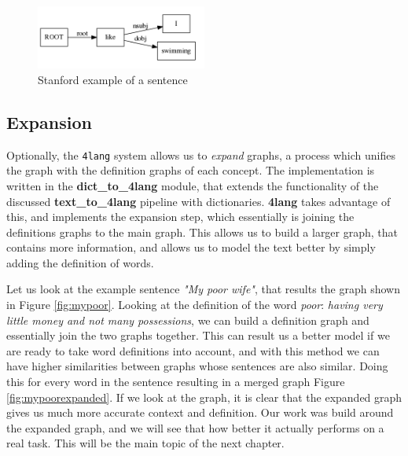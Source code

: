 \begin{figure}[h]
	\centering
	\includegraphics[width=0.5\textwidth]{figures/swimmingdep}
	\caption{Stanford example of a sentence}
	\label{fig:swimmingdep}
\end{figure}


\subsection{Expansion}
Optionally, the \texttt{4lang} system allows us to \textit{expand}
graphs, a process which unifies the graph with the definition graphs of
each concept. The implementation is written in the \textbf{dict\_to\_4lang} module, that extends the functionality of the discussed \textbf{text\_to\_4lang} pipeline with dictionaries. \textbf{4lang} takes advantage of this, and implements the expansion step, which essentially is joining the definitions graphs to the main graph. This allows us to build a larger graph, that contains more information, and allows us to model the text better by simply adding the definition of words.

Let us look at the example sentence \textit{"My poor wife"}, that results the graph shown in Figure \ref{fig:mypoor}. Looking at the definition of the word \textit{poor}: \textit{having very little money and not many possessions}, we can build a definition graph and essentially join the two graphs together. This can result us a better model if we are ready to take word definitions into account, and with this method we can have higher similarities between graphs whose sentences are also similar. Doing this for every word in the sentence resulting in a merged graph Figure \ref{fig:mypoorexpanded}. If we look at the graph, it is clear that the expanded graph gives us much more accurate context and definition. Our work was build around the expanded graph, and we will see that how better it actually performs on a real task. This will be the main topic of the next chapter.

